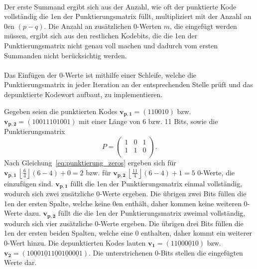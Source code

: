 \\
Der erste Summand ergibt sich aus der Anzahl, wie oft der punktierte Kode vollständig die 1en der Punktierungsmatrix füllt, multipliziert mit der Anzahl an 0en $\left( p-q\right)$. Die Anzahl an zusätzlichen 0-Werten $m$, die eingefügt werden müssen, ergibt sich aus den restlichen Kodebits, die die 1en der Punktierungsmatrix nicht genau voll machen und dadurch vom ersten Summanden nicht berücksichtig werden.
\\
\\
Das Einfügen der 0-Werte ist mithilfe einer Schleife, welche die Punktierungsmatrix in jeder Iteration an der entsprechenden Stelle prüft und das depunktierte Kodewort aufbaut, zu implementieren.
\begin{beispiel}
Gegeben seien die punktierten Kodes \mbox{$\mathbf{v_{p,1}}=(110010)$} bzw.\\ \mbox{$\mathbf{v_{p,2}}=(10011101001)$} mit einer Länge von 6 bzw. 11 Bits, sowie die Punktierungsmatrix
\begin{equation*}
P=
\begin{pmatrix}
1 & 0 & 1 \\
1 & 1 & 0 \\
\end{pmatrix}.
\end{equation*}
Nach Gleichung~\eqref{eq:punktierung_zeros} ergeben sich für $\mathbf{v_{p,1}}\ \left\lfloor \frac{6}{4} \right\rfloor \left(6-4\right)+0=2$ bzw. für $\mathbf{v_{p,2}}\ \left\lfloor \frac{11}{4} \right\rfloor \left(6-4\right)+1=5$ 0-Werte, die einzufügen sind. $\mathbf{v_{p,1}}$ füllt die 1en der Punktierungsmatrix einmal vollständig, wodurch sich zwei zusätzliche 0-Werte ergeben. Die übrigen zwei Bits füllen die 1en der ersten Spalte, welche keine 0en enthält, daher kommen keine weiteren 0-Werte dazu. $\mathbf{v_{p,2}}$ füllt die die 1en der Punktierungsmatrix zweimal vollständig, wodurch sich vier zusätzliche 0-Werte ergeben. Die übrigen drei Bits füllen die 1en der ersten beiden Spalten, welche eine 0 enthalten, daher kommt ein weiterer 0-Wert hinzu. Die depunktierten Kodes lauten \mbox{$\mathbf{v_{1}}=(11\underline{0}00\underline{0}10)$} bzw. \mbox{$\mathbf{v_{2}}=(10\underline{0}01\underline{0}11\underline{0}01\underline{0}00\underline{0}1)$}. Die unterstrichenen 0-Bits stellen die eingefügten Werte dar.
\end{beispiel}

